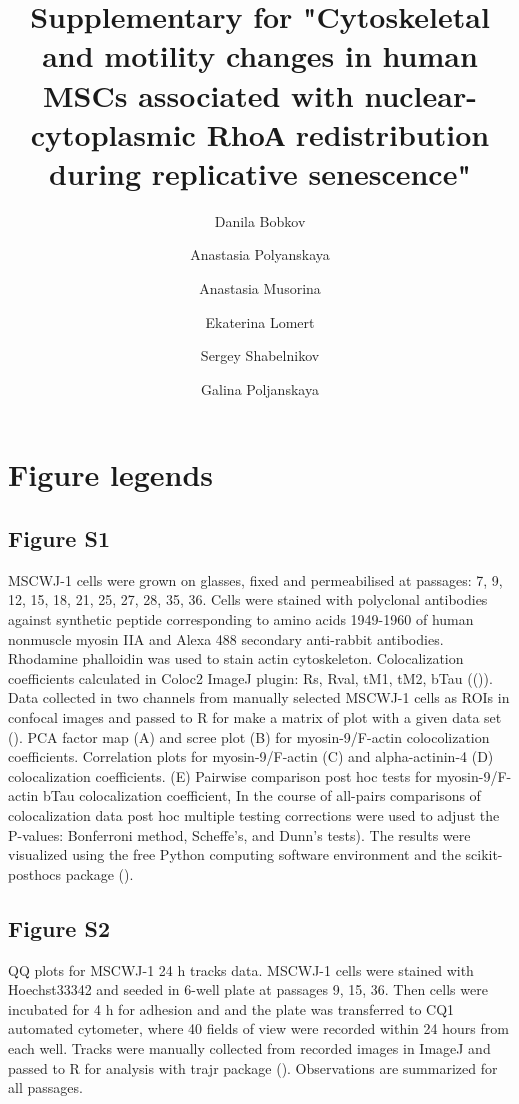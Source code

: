 \documentclass[alpha-refs]{wiley-article}
\title{Supplementary for "Cytoskeletal and motility changes in human MSCs associated with nuclear-cytoplasmic RhoА redistribution during replicative senescence"}
\author[1\authfn{1}]{Danila Bobkov}
\author[2\authfn{2}]{Anastasia Polyanskaya}
\author[1\authfn{1}]{Anastasia Musorina}
\author[1\authfn{1}]{Ekaterina Lomert}
\author[1\authfn{1}]{Sergey Shabelnikov}
\author[1\authfn{1}]{Galina Poljanskaya}
\affil[1]{Institute of Cytology of the Russian Academy of Science, 194064 Tikhoretsky ave. 4, St-Petersburg, Russia }
\affil[2]{Peter the Great St. Petersburg Polytechnic University, Polytechnicheskaya, 29,  St.Petersburg, 195251, Russia}
\begin{document}
\maketitle

\section*{Figure legends}

\subsection*{Figure S1}

MSCWJ-1 cells were grown on glasses, fixed and permeabilised at passages: 7, 9, 12, 15, 18, 21, 25, 27, 28, 35, 36. Cells were stained with polyclonal antibodies against synthetic peptide corresponding to amino acids 1949-1960 of human nonmuscle myosin IIA and Alexa 488 secondary anti-rabbit antibodies. Rhodamine phalloidin was used to stain actin cytoskeleton. Colocalization coefficients calculated in Coloc2 ImageJ plugin: Rs, Rval, tM1, tM2, bTau ((\cite{rueden2017imagej2})).
Data collected in two channels from manually selected MSCWJ-1 cells as ROIs in confocal images and passed to R for make a matrix of plot with a given data set (\cite{emerson2013generalized}).
PCA factor map (A) and scree plot (B) for myosin-9/F-actin colocolization coefficients. Correlation plots for myosin-9/F-actin (C) and alpha-actinin-4 (D) colocalization coefficients. (E) Pairwise comparison post hoc tests for myosin-9/F-actin bTau colocalization coefficient, In the course of all-pairs comparisons of colocalization data post hoc multiple testing corrections were used to adjust the P-values: Bonferroni method, Scheffe’s, and Dunn’s tests).
The results were visualized using the free Python computing software environment and the scikit-posthocs package (\cite{Terpilowski2019}).

\subsection*{Figure S2}

QQ plots for MSCWJ-1 24 h tracks data.
MSCWJ-1 cells were stained with Hoechst33342 and seeded in 6-well plate at passages 9, 15, 36.
Then cells were incubated for 4 h for adhesion and and the plate was transferred to CQ1 automated cytometer, where 40 fields of view were recorded within 24 hours from each well.
Tracks were manually collected from recorded images in ImageJ and passed to R for analysis with trajr package (\cite{mclean2018trajr}).
Observations are summarized for all passages.
\end{document}
